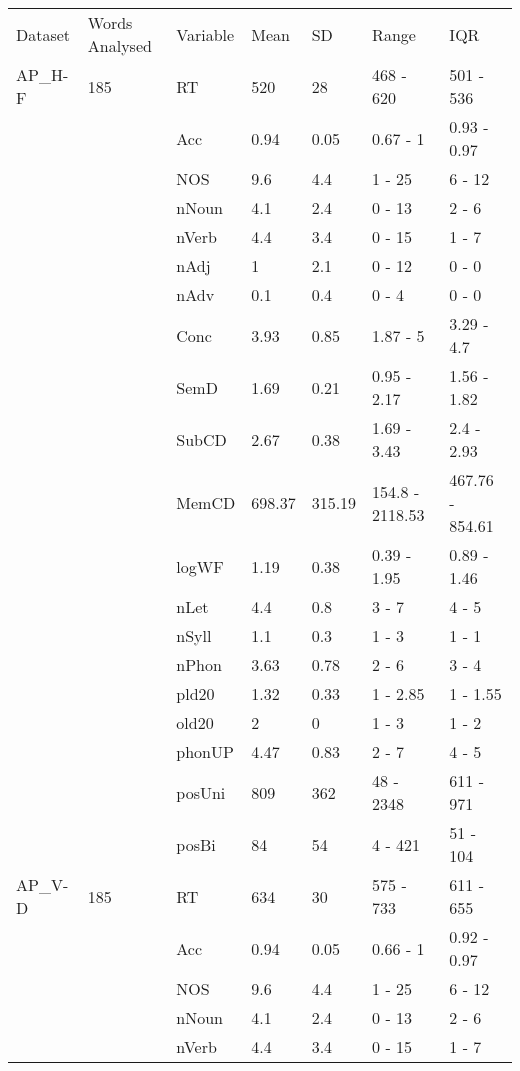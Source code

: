 \begin{table}[ht]
\centering
\begingroup\normalsize
\begin{tabular}{lllllll}
  \hline
  \hline
Dataset & Words Analysed & Variable & Mean & SD & Range & IQR \\ 
  AP\_H-F & 185 & RT & 520 & 28 & 468 - 620 & 501 - 536 \\ 
   &  & Acc & 0.94 & 0.05 & 0.67 - 1 & 0.93 - 0.97 \\ 
   &  & NOS & 9.6 & 4.4 & 1 - 25 & 6 - 12 \\ 
   &  & nNoun & 4.1 & 2.4 & 0 - 13 & 2 - 6 \\ 
   &  & nVerb & 4.4 & 3.4 & 0 - 15 & 1 - 7 \\ 
   &  & nAdj & 1 & 2.1 & 0 - 12 & 0 - 0 \\ 
   &  & nAdv & 0.1 & 0.4 & 0 - 4 & 0 - 0 \\ 
   &  & Conc & 3.93 & 0.85 & 1.87 - 5 & 3.29 - 4.7 \\ 
   &  & SemD & 1.69 & 0.21 & 0.95 - 2.17 & 1.56 - 1.82 \\ 
   &  & SubCD & 2.67 & 0.38 & 1.69 - 3.43 & 2.4 - 2.93 \\ 
   &  & MemCD & 698.37 & 315.19 & 154.8 - 2118.53 & 467.76 - 854.61 \\ 
   &  & logWF & 1.19 & 0.38 & 0.39 - 1.95 & 0.89 - 1.46 \\ 
   &  & nLet & 4.4 & 0.8 & 3 - 7 & 4 - 5 \\ 
   &  & nSyll & 1.1 & 0.3 & 1 - 3 & 1 - 1 \\ 
   &  & nPhon & 3.63 & 0.78 & 2 - 6 & 3 - 4 \\ 
   &  & pld20 & 1.32 & 0.33 & 1 - 2.85 & 1 - 1.55 \\ 
   &  & old20 & 2 & 0 & 1 - 3 & 1 - 2 \\ 
   &  & phonUP & 4.47 & 0.83 & 2 - 7 & 4 - 5 \\ 
   &  & posUni & 809 & 362 & 48 - 2348 & 611 - 971 \\ 
   &  & posBi & 84 & 54 & 4 - 421 & 51 - 104 \\ 
  AP\_V-D & 185 & RT & 634 & 30 & 575 - 733 & 611 - 655 \\ 
   &  & Acc & 0.94 & 0.05 & 0.66 - 1 & 0.92 - 0.97 \\ 
   &  & NOS & 9.6 & 4.4 & 1 - 25 & 6 - 12 \\ 
   &  & nNoun & 4.1 & 2.4 & 0 - 13 & 2 - 6 \\ 
   &  & nVerb & 4.4 & 3.4 & 0 - 15 & 1 - 7 \\ 

\end{tabular}
\end{table}
